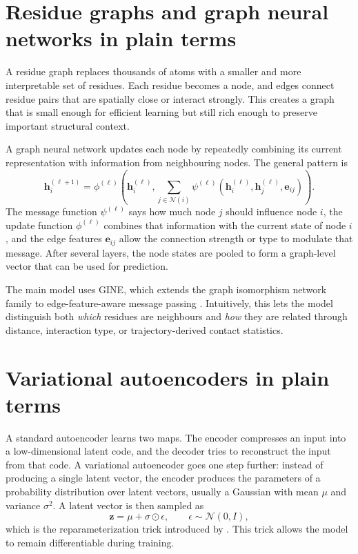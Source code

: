 \section{Residue graphs and graph neural networks in plain terms}

A residue graph replaces thousands of atoms with a smaller and more interpretable set of residues. Each residue becomes a node, and edges connect residue pairs that are spatially close or interact strongly. This creates a graph that is small enough for efficient learning but still rich enough to preserve important structural context.

A graph neural network updates each node by repeatedly combining its current representation with information from neighbouring nodes. The general pattern is
\begin{equation}
\mathbf{h}_i^{(\ell+1)}
=
\phi^{(\ell)}
\left(
\mathbf{h}_i^{(\ell)},
\sum_{j\in \mathcal{N}(i)}
\psi^{(\ell)}(\mathbf{h}_i^{(\ell)}, \mathbf{h}_j^{(\ell)}, \mathbf{e}_{ij})
\right).
\end{equation}
The message function $\psi^{(\ell)}$ says how much node $j$ should influence node $i$, the update function $\phi^{(\ell)}$ combines that information with the current state of node $i$, and the edge features $\mathbf{e}_{ij}$ allow the connection strength or type to modulate that message. After several layers, the node states are pooled to form a graph-level vector that can be used for prediction.

The main model uses GINE, which extends the graph isomorphism network family to edge-feature-aware message passing \citep{Xu2019GIN,Hu2020Pretraining}. Intuitively, this lets the model distinguish both \emph{which} residues are neighbours and \emph{how} they are related through distance, interaction type, or trajectory-derived contact statistics.

\section{Variational autoencoders in plain terms}

A standard autoencoder learns two maps. The encoder compresses an input into a low-dimensional latent code, and the decoder tries to reconstruct the input from that code. A variational autoencoder goes one step further: instead of producing a single latent vector, the encoder produces the parameters of a probability distribution over latent vectors, usually a Gaussian with mean $\mu$ and variance $\sigma^2$. A latent vector is then sampled as
\begin{equation}
\mathbf{z} = \mu + \sigma \odot \epsilon,
\qquad
\epsilon \sim \mathcal{N}(0,I),
\end{equation}
which is the reparameterization trick introduced by \citet{Kingma2014VAE}. This trick allows the model to remain differentiable during training.

